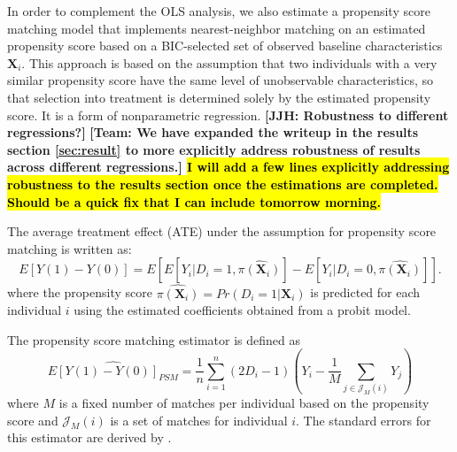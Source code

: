 In order to complement the OLS analysis, we also estimate a propensity score matching model that implements nearest-neighbor matching on an estimated propensity score based on a BIC-selected set of observed baseline characteristics $\boldsymbol{X}_i$. This approach is based on the assumption that two individuals with a very similar propensity score have the same level of unobservable characteristics, so that selection into treatment is determined solely by the estimated propensity score. It is a form of nonparametric regression. \textbf{[JJH: Robustness to different regressions?]} \textbf{[Team: We have expanded the writeup in the results section \ref{sec:result} to more explicitly address robustness of results across different regressions.] \hl{I will add a few lines explicitly addressing robustness to the results section once the estimations are completed. Should be a quick fix that I can include tomorrow morning.}} %

The average treatment effect (ATE) under the assumption for propensity score matching is written as:
\begin{equation} \label{eq:ATE-PSM}
E[Y(1)-Y(0)] = E[E[Y_i|D_i=1, \hat{\pi(\boldsymbol{X}_i)}] - E[Y_i|D_i=0, \hat{\pi(\boldsymbol{X}_i)}]].
\end{equation}
where the propensity score $\hat{\pi({\boldsymbol{X}_i})} = Pr(D_i=1|\boldsymbol{X}_i)$ is predicted for each individual $i$ using the estimated coefficients obtained from a probit model.

The propensity score matching estimator is defined as
\begin{equation} \label{eq:PSM-estimator}
\widehat{E[Y(1)-Y(0)]_{PSM}} = \frac{1}{n} \sum_{i=1}^{n} (2D_i -1)(Y_i - \frac{1}{M}\sum_{j \in \mathcal{J}_M(i)}Y_j )
\end{equation}
where $M$ is a fixed number of matches per individual based on the propensity score and $\mathcal{J}_M(i)$ is a set of matches for individual $i$. The standard errors for this estimator are derived by \cite{Abadie_Imbens_2006_Econometrica}.

